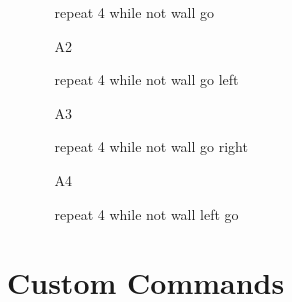 \begin{enumerate}
\begin{enumerate}
\begin{bluecode}
repeat 4
    while not wall
        go
\end{bluecode}
\item[A2] 
\begin{bluecode}
repeat 4
    while not wall
        go
    left
\end{bluecode}
\item[A3] 
\begin{bluecode}
repeat 4
    while not wall
        go
    right
\end{bluecode}
\item[A4] 
\begin{bluecode}
repeat 4
    while not wall
        left
    go
\end{bluecode}
\end{enumerate}
\end{enumerate}


\section{Custom Commands}

